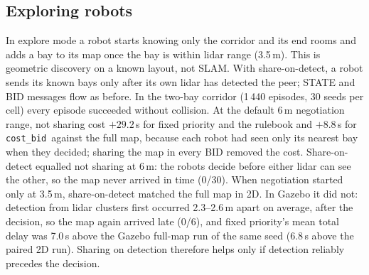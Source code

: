 \documentclass[letterpaper,journal]{IEEEtran}
\newcommand{\cb}{\texttt{cost\_bid}}
\begin{document}
\subsection{Exploring robots}\label{sec:explore}
In explore mode a robot starts knowing only the corridor and its end rooms and adds a bay to its map once the bay is within lidar range (3.5\,m). This is geometric discovery on a known layout, not SLAM. With share-on-detect, a robot sends its known bays only after its own lidar has detected the peer; STATE and BID messages flow as before. In the two-bay corridor (1\,440 episodes, 30 seeds per cell) every episode succeeded without collision. At the default 6\,m negotiation range, not sharing cost $+29.2$\,s for fixed priority and the rulebook and $+8.8$\,s for \cb\ against the full map, because each robot had seen only its nearest bay when they decided; sharing the map in every BID removed the cost. Share-on-detect equalled not sharing at 6\,m: the robots decide before either lidar can see the other, so the map never arrived in time (0/30). When negotiation started only at 3.5\,m, share-on-detect matched the full map in 2D. In Gazebo it did not: detection from lidar clusters first occurred 2.3--2.6\,m apart on average, after the decision, so the map again arrived late (0/6), and fixed priority's mean total delay was 7.0\,s above the Gazebo full-map run of the same seed (6.8\,s above the paired 2D run). Sharing on detection therefore helps only if detection reliably precedes the decision.
\end{document}
